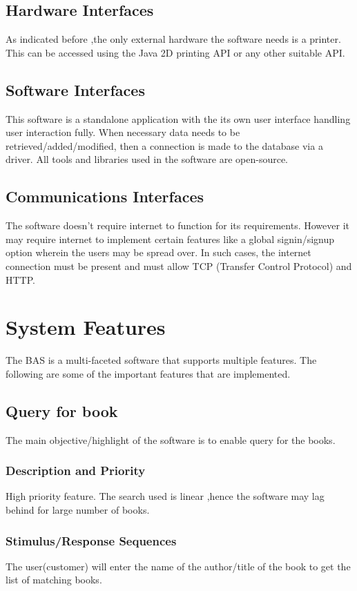 \documentclass{scrreprt}
\begin{document}
\section{Hardware Interfaces}
As indicated before ,the only external hardware the software needs is a printer. This can be accessed using the Java 2D printing API or any other suitable API. 

\section{Software Interfaces}

This software is a standalone application with the its own user interface handling user interaction fully. When necessary data needs to be retrieved/added/modified, then a connection is made to the database via a driver. All tools and libraries used in the software are open-source. 

\section{Communications Interfaces}

The software doesn't require internet to function for its requirements. However it may require internet to implement certain features like a global signin/signup option wherein the users may be spread over. In such cases, the internet connection must be present and must allow TCP (Transfer Control Protocol) and HTTP.


\chapter{System Features}
The BAS is a multi-faceted software that supports multiple features. The following are some of the important features that are implemented. \\


\section{Query for book}
The main objective/highlight of the software is to enable query for the books.
\subsection{Description and Priority}
High priority feature. The search used is linear ,hence the software may lag behind for large number of books. 

\subsection{Stimulus/Response Sequences}
The user(customer) will enter the name of the author/title of the book to get the list of matching books. 
\end{document}
